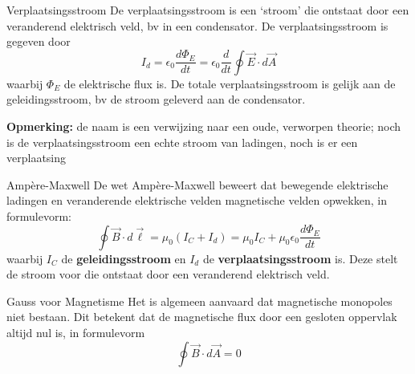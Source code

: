\begin{theo}[Verplaatsingsstroom]{Verplaatsingsstroom}
    De verplaatsingsstroom is een `stroom' die ontstaat door een veranderend elektrisch veld, bv in een condensator. De verplaatsingsstroom is gegeven door
    \begin{equation*}
        I_d = \epsilon_0 \frac{d\Phi_E}{dt} = \epsilon_0 \frac{d}{dt} \oint \Vec{E} \cdot d\Vec{A}
    \end{equation*}
    waarbij $ \Phi_E $ de elektrische flux is.
    De totale verplaatsingsstroom is gelijk aan de geleidingsstroom, bv de stroom geleverd aan de condensator.

    \vspace{0.3cm}
    \noindent \textbf{Opmerking:} de naam is een verwijzing naar een oude, verworpen theorie; noch is de verplaatsingsstroom een echte stroom van ladingen, noch is er een verplaatsing
\end{theo}

\begin{lem}{Ampère-Maxwell}
    De wet Ampère-Maxwell beweert dat bewegende elektrische ladingen en veranderende elektrische velden magnetische velden opwekken, in formulevorm:
    \begin{equation*}
        \oint \Vec{B} \cdot d\Vec{\ell}
        = \mu_0 ( I_C + I_d ) 
        = \mu_0 I_C + \mu_0 \epsilon_0 \frac{d\Phi_E}{dt} 
    \end{equation*}
    waarbij $ I_C $ de \textbf{geleidingsstroom} en $ I_d $ de \textbf{verplaatsingsstroom} is. Deze stelt de stroom voor die ontstaat door een veranderend elektrisch veld. 
\end{lem}

\begin{lem}{Gauss voor Magnetisme}
    Het is algemeen aanvaard dat magnetische monopoles niet bestaan. Dit betekent dat de magnetische flux door een gesloten oppervlak altijd nul is, in formulevorm
    \begin{equation*}
        \oint \Vec{B} \cdot d\Vec{A} = 0
    \end{equation*}
    \vspace{-0.5cm}
\end{lem}


